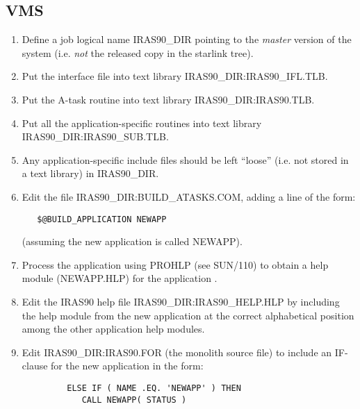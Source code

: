\subsection{VMS}
\begin{enumerate}
\item Define a job logical name {\small IRAS90\_DIR} pointing to the
{\em master} version of the system (i.e. {\em not} the
released copy in the starlink tree).

\item Put the interface file into text library {\small 
IRAS90\_DIR:IRAS90\_IFL.TLB}.

\item Put the A-task routine into text library {\small IRAS90\_DIR:IRAS90.TLB}.

\item Put all the application-specific routines into text library 
{\small IRAS90\_DIR:IRAS90\_SUB.TLB}.

\item Any application-specific include files should be left ``loose'' (i.e. not
stored in a text library) in {\small IRAS90\_DIR}.

\item Edit the file {\small IRAS90\_DIR:BUILD\_ATASKS.COM}, adding a line of the 
form:

\small 
\begin{verbatim}
   $@BUILD_APPLICATION NEWAPP
\end{verbatim}
\normalsize

(assuming the new application is called {\small NEWAPP}).

\item Process the application using {\small PROHLP} (see SUN/110) to obtain
a help module ({\small NEWAPP.HLP}) for the application .

\item Edit the {\small IRAS90} help file {\small IRAS90\_DIR:IRAS90\_HELP.HLP}
by including the help module from the new application 
at the correct alphabetical position among the other application help modules.

\item Edit {\small IRAS90\_DIR:IRAS90.FOR} (the monolith source file) to 
include an IF-clause for the new application in the form:

\small
\begin{verbatim}
         ELSE IF ( NAME .EQ. 'NEWAPP' ) THEN
            CALL NEWAPP( STATUS )
\end{verbatim}
\normalsize


\end{enumerate}
